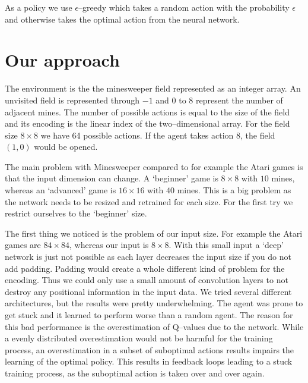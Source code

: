 As a policy we use $\epsilon$--greedy which takes a random action with the probability $\epsilon$ and otherwise takes the optimal action from the neural network.

\section{Our approach}
The environment is the the minesweeper field represented as an integer array.
An unvisited field is represented through $-1$ and $0$ to $8$ represent the number of adjacent mines.
The number of possible actions is equal to the size of the field and its encoding is the linear index of the two--dimensional array.
For the field size $8 \times 8$ we have 64 possible actions.
If the agent takes action $8$, the field $(1, 0)$ would be opened.

The main problem with Minesweeper compared to for example the Atari games is that the input dimension can change.
A `beginner' game is $8 \times 8$ with $10$ mines, whereas an `advanced' game is $16 \times 16$ with $40$ mines.
This is a big problem as the network needs to be resized and retrained for each size.
For the first try we restrict ourselves to the `beginner' size.

The first thing we noticed is the problem of our input size.
For example the Atari games are $84 \times 84$, whereas our input is $8 \times 8$.
With this small input a `deep' network is just not possible as each layer decreases the input size if you do not add padding.
Padding would create a whole different kind of problem for the encoding.
Thus we could only use a small amount of convolution layers to not destroy any positional information in the input data.
We tried several different architectures, but the results were pretty underwhelming.
The agent was prone to get stuck and it learned to perform worse than a random agent.
The reason for this bad performance is the overestimation of Q--values due to the network.
While a evenly distributed overestimation would not be harmful for the training process, an overestimation in a subset of suboptimal actions results impairs the learning of the optimal policy.
This results in feedback loops leading to a stuck training process, as the suboptimal action is taken over and over again.

